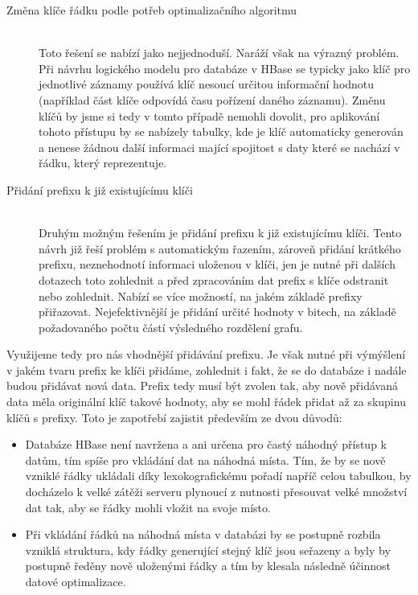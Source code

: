 \documentclass[thesis=M,czech]{FITthesis}[2012/06/26]
\begin{document}
\begin{description}
\item[Změna klíče řádku podle potřeb optimalizačního algoritmu] \hfill \\
 Toto řešení se nabízí jako nejjednoduší. Naráží však na výrazný problém. Při návrhu logického modelu pro databáze v HBase se typicky jako klíč pro jednotlivé záznamy používá klíč nesoucí určitou informační hodnotu (například část klíče odpovídá času pořízení daného záznamu). Změnu klíčů by jsme si tedy v tomto případě nemohli dovolit, pro aplikování tohoto přístupu by se nabízely tabulky, kde je klíč automaticky generován a nenese žádnou další informaci mající spojitost s daty které se nachází v řádku, který reprezentuje.
 
 \item[Přidání prefixu k již existujícímu klíči] \hfill \\
 Druhým možným řešením je přidání prefixu k již existujícímu klíči. Tento návrh již řeší problém s automatickým řazením, zároveň přidání krátkého prefixu, neznehodnotí informaci uloženou v klíči, jen je nutné při dalších dotazech toto zohlednit a před zpracováním dat prefix s klíče odstranit nebo zohlednit. Nabízí se více možností, na jakém základě prefixy přiřazovat. Nejefektivnější je přidání určité hodnoty v bitech, na základě požadovaného počtu částí výsledného rozdělení grafu.
 
\end{description} 

Využijeme tedy pro nás vhodnější přidávání prefixu. Je však nutné při výmýšlení v jakém tvaru prefix ke klíči přidáme, zohlednit i fakt, že se do databáze i nadále budou přidávat nová data. Prefix tedy musí být zvolen tak, aby nově přidávaná data měla originální klíč takové hodnoty, aby se mohl řádek přidat až za skupinu klíčů s prefixy. Toto je zapotřebí zajistit především ze dvou důvodů:

\begin{itemize}
\item Databáze HBase není navržena a ani určena pro častý náhodný přístup k datům, tím spíše pro vkládání dat na náhodná místa. Tím, že by se nově vzniklé řádky ukládali díky lexokografickému pořadí napříč celou tabulkou, by docházelo k velké zátěži serveru plynoucí z nutnosti přesouvat velké množství dat tak, aby se řádky mohli vložit na svoje místo.
 
\item Při vkládání řádků na náhodná místa v databázi by se postupně rozbila vzniklá struktura, kdy řádky generující stejný klíč jsou seřazeny a byly by postupně ředěny nově uloženými řádky a tím by klesala následně účinnost datové optimalizace. 
\end{itemize}
\end{document}

